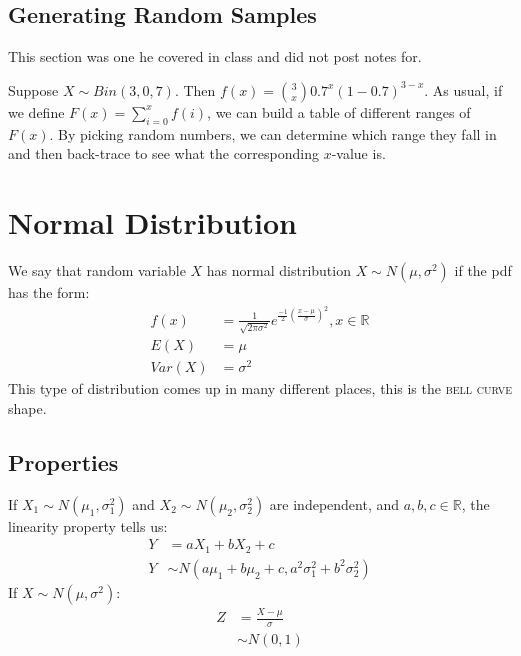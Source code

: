             \section{Generating Random Samples} %
            \label{sec:generating_random_samples}
                This section was one he covered in class and did not post notes for.

                Suppose $X \sim Bin(3, 0, 7)$.
                Then $f(x) = {3 \choose x} 0.7^x (1-0.7)^{3-x}$.
                As usual, if we define $F(x) = \sum_{i=0}^x f(i)$, we can build a table of different ranges of $F(x)$.
                By picking random numbers, we can determine which range they fall in and then back-trace to see what the corresponding $x$-value is.
        \chapter{Normal Distribution} %
        \label{cha:normal_distribution}
            We say that random variable $X$ has normal distribution $X \sim N(\mu, \sigma^2)$ if the pdf has the form:
            \begin{align*}
                f(x) &= \frac{1}{\sqrt{2 \pi \sigma^2}} e^{\frac{-1}{2} \left( \frac{x - \mu}{\sigma} \right)^2}, x \in \mathbb{R} \\
                E(X) &= \mu \\
                Var(X) &= \sigma^2
            \end{align*}
            This type of distribution comes up in many different places, this is the \textsc{bell curve} shape.
            \section{Properties} %
            \label{sec:properties}
                If $X_1 \sim N(\mu_1, \sigma_1^2)$ and $X_2 \sim N(\mu_2, \sigma_2^2)$ are independent, and $a, b, c \in \mathbb{R}$, the linearity property tells us:
                \begin{align*}
                    Y &= aX_1 + bX_2 + c \\
                    Y &\sim N(a \mu_1 + b \mu_2 + c, a^2\sigma_1^2 + b^2 \sigma_2^2)
                \end{align*}
                If $X \sim N(\mu, \sigma^2)$: %
                \begin{align*}
                    Z &= \frac{X - \mu}{\sigma} \\
                    &\sim N(0, 1)
                \end{align*}


